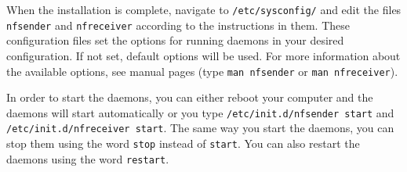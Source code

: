 \documentclass[11pt,a4paper]{article}
\begin{document}
When the installation is complete, navigate to \texttt{/etc/sysconfig/} and edit the files \texttt{nf\textunderscore sender} and \texttt{nf\textunderscore receiver} according to the instructions in them. These configuration files set the options for running daemons in your desired configuration. If not set, default options will be used. For more information about the available options, see manual pages (type \texttt{man nf\textunderscore sender} or \texttt{man nf\textunderscore receiver}).

In order to start the daemons, you can either reboot your computer and the daemons will start automatically or you type \texttt{/etc/init.d/nf\textunderscore sender start} and \texttt{/etc/init.d/nf\textunderscore receiver start}. The same way you start the daemons, you can stop them using the word \texttt{stop} instead of \texttt{start}. You can also restart the daemons using the word \texttt{restart}. 
\end{document}
